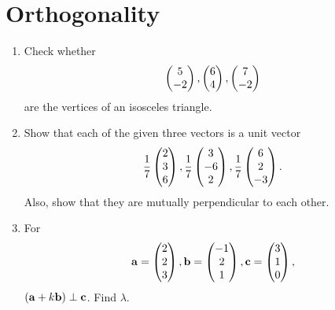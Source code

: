 \documentclass[journal,12pt,twocolumn]{IEEEtran}
\renewcommand\thesection{\arabic{section}}
\begin{document}
\section{Orthogonality}
\renewcommand{\theequation}{\theenumi}
\begin{enumerate}[label=\thesection.\arabic*.,ref=\thesection.\theenumi]
\item Check whether 
\begin{align}
\begin{pmatrix}5\\-2\end{pmatrix}, \begin{pmatrix}6\\4\end{pmatrix}, \begin{pmatrix}7\\-2\end{pmatrix}
\end{align}
are the vertices of an isosceles triangle.
%
\\
\solution
%
\item Show that each of the given three vectors is a unit vector
\begin{align}
 \frac{1}{7}\begin{pmatrix}2\\3\\6\end{pmatrix}, \frac{1}{7}\begin{pmatrix}3\\-6\\2\end{pmatrix}, \frac{1}{7}\begin{pmatrix}6\\2\\-3\end{pmatrix}.
\end{align}
Also,  show that they are mutually perpendicular to each other.
\\
\solution 

\item For 
\begin{align}
\mathbf{a} = \begin{pmatrix}2\\2\\3\end{pmatrix}, \mathbf{b} = \begin{pmatrix}-1\\2\\1\end{pmatrix}, \mathbf{c} = \begin{pmatrix}3\\1\\0\end{pmatrix},
\end{align}
$\left(\mathbf{a}+k\mathbf{b}\right)\perp\mathbf{c}$.  Find $\lambda$.
\solution


\end{enumerate}
\end{document}
